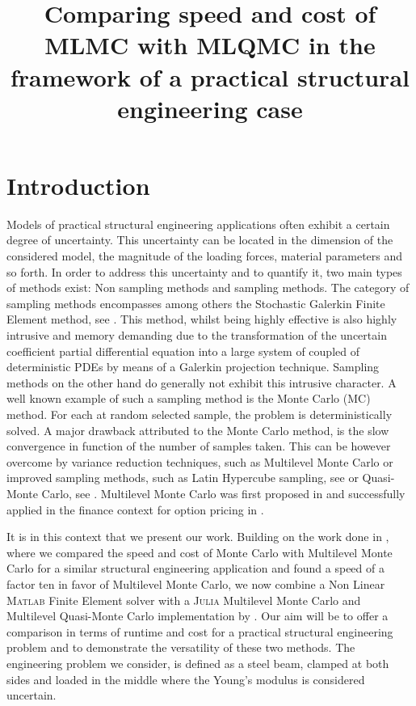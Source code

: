 \documentclass{ICASP13Paper}
\title{Comparing speed and cost of MLMC with MLQMC in the framework of a practical structural engineering case}
\begin{document}
\section{Introduction}
Models of practical structural engineering applications often exhibit a certain degree of uncertainty. This uncertainty can be located in the dimension of the considered model, the magnitude of the loading forces, material parameters and so forth. In order to address this uncertainty and to quantify it, two main types of methods exist: Non sampling methods and sampling methods. The category of sampling methods encompasses among others the Stochastic Galerkin Finite Element method, see \cite{GhanemAndSpanos}. This method, whilst being highly effective is also highly intrusive and memory demanding due to the transformation of the uncertain coefficient partial differential equation into a large system of coupled of deterministic PDEs by means of a Galerkin projection technique. Sampling methods on the other hand do generally not exhibit this intrusive character. A well known example of such a sampling method is the Monte Carlo (MC) method. For each at random selected sample, the problem is deterministically solved. A major drawback attributed to the Monte Carlo method, is the slow convergence in function of the number of samples taken. This can be however overcome by variance reduction techniques, such as Multilevel Monte Carlo or improved sampling methods, such as Latin Hypercube sampling, see \cite{Loh} or Quasi-Monte Carlo, see \cite{Caflish,Niederreiter}. Multilevel Monte Carlo was first proposed in \cite{Heinrich} and successfully applied in the finance context for option pricing in \cite{Giles}. 

It is in this context that we present our work. Building on the work done in \cite{Blondeel,Blondeel2}, where we compared the speed and cost of Monte Carlo with Multilevel Monte Carlo for a similar structural engineering application and found a speed of a factor ten in favor of Multilevel Monte Carlo, we now combine a Non Linear \textsc{Matlab} Finite Element solver with a \textsc{Julia} Multilevel Monte Carlo and Multilevel Quasi-Monte Carlo implementation by \cite{PJ,PJ2}. Our aim will be to offer a comparison in terms of runtime and cost for a practical structural engineering problem and to demonstrate the versatility  of these two methods. The engineering problem we consider, is defined as a steel beam, clamped at both sides and loaded in the middle where the Young's modulus is considered uncertain.
\end{document}
